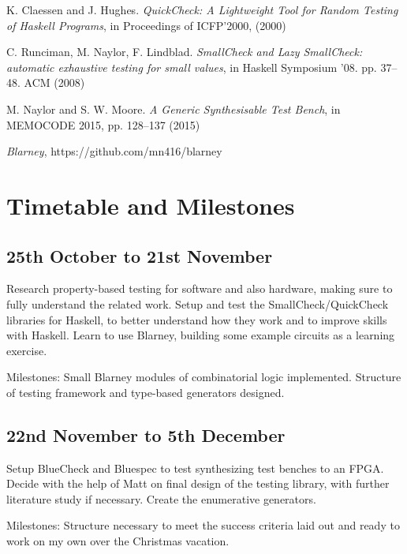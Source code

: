 \documentclass[UKenglish, 12pt]{article}
\begin{document}
\begin{thebibliography}{9}

    K. Claessen and J. Hughes. \emph{QuickCheck:  A Lightweight Tool for Random Testing of Haskell Programs}, in Proceedings of ICFP’2000, (2000)
    
    C. Runciman, M. Naylor, F. Lindblad. \emph{SmallCheck and Lazy SmallCheck: automatic exhaustive testing for small values}, in Haskell Symposium ’08. pp. 37–48. ACM (2008) 
    
    M. Naylor and S. W. Moore. \emph{A Generic Synthesisable Test Bench}, in MEMOCODE 2015, pp. 128–137 (2015)
    
    \emph{Blarney}, https://github.com/mn416/blarney
    
\end{thebibliography}


\newpage
\section*{Timetable and Milestones}

\subsection*{25th October to 21st November}

Research property-based testing for software and also hardware, making sure to
fully understand the related work. Setup and test the SmallCheck/QuickCheck
libraries for Haskell, to better understand how they work and to improve skills
with Haskell.
Learn to use Blarney, building some example circuits as a learning exercise.

Milestones: Small Blarney modules of combinatorial logic implemented. Structure of testing framework and type-based generators designed.


\subsection*{22nd November to 5th December}

Setup BlueCheck and Bluespec to test synthesizing test benches to an
FPGA.
Decide with the help of Matt on final design of the testing library, with
further literature study if necessary. Create the enumerative generators.

Milestones: Structure necessary to meet the success criteria laid out and
ready to work on my own over the Christmas vacation.
\end{document}
